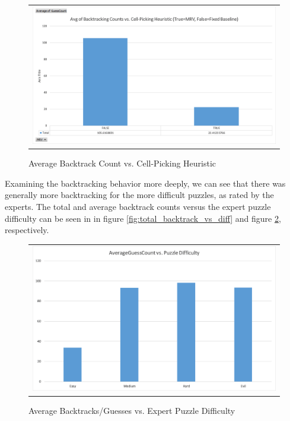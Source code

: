 \documentclass{article}
\begin{document}
\begin{figure}[H]%
	\centering\begin{tabular}{c}
		\includegraphics[scale=0.4]{plots/avg-backtrack-count-vs-cell-picking-heuristic.png}\\
	\end{tabular}
	\caption{Average Backtrack Count vs. Cell-Picking Heuristic}%
	\label{fig:avg_backtrack_count_vs_cell_heuristic}%
\end{figure}

Examining the backtracking behavior more deeply, we can see that there was generally more backtracking for the more difficult puzzles, as rated by the experts.  The total and average backtrack counts versus the expert puzzle difficulty can be seen in in figure \ref{fig:total_backtrack_vs_diff} and figure \ref{fig:avg_backtracks_vs_diff}, respectively.\\

\begin{figure}[H]%
	\centering\begin{tabular}{c}
		\includegraphics[scale=0.4]{plots/avg-guess-count-vs-puzzle-diff.png}\\
	\end{tabular}
	\caption{Average Backtracks/Guesses vs. Expert Puzzle Difficulty}%
	\label{fig:avg_backtracks_vs_diff}%
\end{figure}
\end{document}
